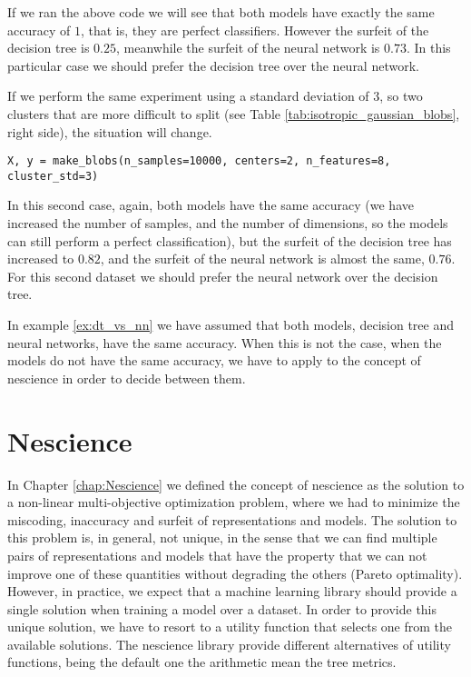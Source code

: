 \begin{example}
\begin{sourcecode}
{\begin{verbatim}
\end{verbatim}}
\end{sourcecode}

If we ran the above code we will see that both models have exactly the same accuracy of $1$, that is, they are perfect classifiers. However the surfeit of the decision tree is $0.25$, meanwhile the surfeit of the neural network is $0.73$. In this particular case we should prefer the decision tree over the neural network.

If we perform the same experiment using a standard deviation of $3$, so two clusters that are more difficult to split (see Table \ref{tab:isotropic_gaussian_blobs}, right side), the situation will change.

\begin{sourcecode}
{\scriptsize \begin{verbatim}
X, y = make_blobs(n_samples=10000, centers=2, n_features=8, cluster_std=3)
\end{verbatim}}
\end{sourcecode}

In this second case, again, both models have the same accuracy (we have increased the number of samples, and the number of dimensions, so the models can still perform a perfect classification), but the surfeit of the decision tree has increased to $0.82$, and the surfeit of the neural network is almost the same, $0.76$. For this second dataset we should prefer the neural network over the decision tree.

\end{example}

In example \ref{ex:dt_vs_nn} we have assumed that both models, decision tree and neural networks, have the same accuracy. When this is not the case, when the models do not have the same accuracy, we have to apply to the concept of nescience in order to decide between them. 

%
%

\section{Nescience}

In Chapter \ref{chap:Nescience} we defined the concept of nescience as the solution to a non-linear multi-objective optimization problem, where we had to minimize the miscoding, inaccuracy and surfeit of representations and models. The solution to this problem is, in general, not unique, in the sense that we can find multiple pairs of representations and models that have the property that we can not improve one of these quantities without degrading the others (Pareto optimality). However, in practice, we expect that a machine learning library should provide a single solution when training a model over a dataset. In order to provide this unique solution, we have to resort to a utility function that selects one from the available solutions. The nescience library provide different alternatives of utility functions, being the default one the arithmetic mean the tree metrics.

